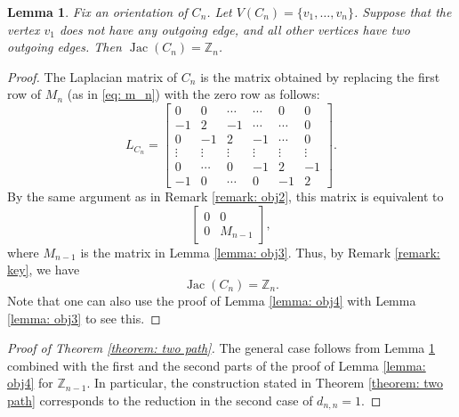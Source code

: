 \documentclass[11pt,reqno]{amsart}
\DeclareMathOperator{\Jac}{Jac}
\newcommand{\youngsu}[1]{{\textcolor{blue}{Youngsu: #1}}}
\theoremstyle{definition}
\theoremstyle{plain}
\newtheorem{lemma}[mydef]{Lemma}
\begin{document}
\begin{lemma} \label{lemma: final lemma}
Fix an orientation of $C_n$. Let $V(C_n)=\{v_1,\dots,v_n\}$. Suppose that the vertex $v_1$ does not have any outgoing edge, and all other vertices have two outgoing edges. 
Then $\Jac (C_n) = \mathbb{Z}_n$.
\end{lemma}

\begin{proof}
The Laplacian matrix of $C_n$ is the matrix obtained by replacing the first row of $M_n$ (as in \eqref{eq: m_n}) with the zero row as follows:
\begin{equation}
L_{C_n}=\begin{bmatrix}
0 & 0 & \cdots  &\cdots  &0 &0 \\
-1 & 2 & -1 & \cdots & \cdots & 0 \\
0 & -1 & 2 & -1 & \cdots & 0\\
\vdots &  \vdots & \vdots & \vdots & \vdots &\vdots \\
0 &  \cdots& 0 & -1 & 2 & -1 \\
-1 &  0 & \cdots & 0 &  -1 & 2 
\end{bmatrix}. 
\end{equation}
By the same argument as in Remark \ref{remark: obj2}, this matrix is equivalent to 
\begin{equation}
\left[ \begin{array}{c|c}
0 & 0 \\
\hline 
0 & M_{n-1}
\end{array} \right],
\end{equation}
where $M_{n-1}$ is the matrix in Lemma \ref{lemma: obj3}.
Thus, by Remark \ref{remark: key}, we have
\[
\Jac (C_n) = \mathbb{Z}_n.
\]
Note that one can also use the proof of Lemma \ref{lemma: obj4} with Lemma \ref{lemma: obj3} to see this. 
\end{proof}


\begin{proof}[Proof of Theorem \ref{theorem: two path}]
The general case follows from Lemma \ref{lemma: final lemma} combined with the first and the second parts of the proof of Lemma \ref{lemma: obj4} for $\mathbb{Z}_{n-1}$. In particular, the construction stated in Theorem \ref{theorem: two path} corresponds to the reduction in the second case of $d_{n,n}=1$. 
\end{proof}
\end{document}
